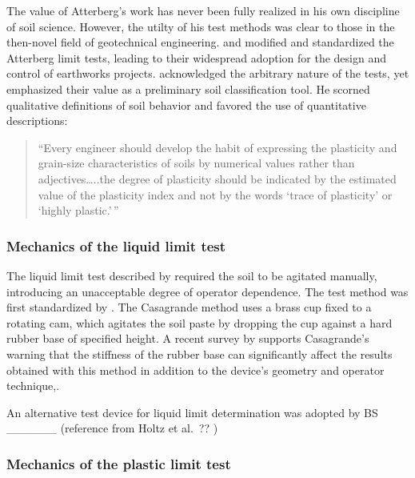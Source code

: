 \documentclass[
]{book}
\begin{document}
The value of Atterberg's work has never been fully realized in his own discipline of soil science. However, the utilty of his test methods was clear to those in the then-novel field of geotechnical engineering. \citet{Terzaghi1926} and \citet{Casagrande1932} modified and standardized the Atterberg limit tests, leading to their widespread adoption for the design and control of earthworks projects. \citet{Terzaghi1926} acknowledged the arbitrary nature of the tests, yet emphasized their value as a preliminary soil classification tool. He scorned qualitative definitions of soil behavior and favored the use of quantitative descriptions:

\begin{quote}
``Every engineer should develop the habit of expressing the plasticity and grain-size characteristics of soils by numerical values rather than adjectives\ldots..the degree of plasticity should be indicated by the estimated value of the plasticity index and not by the words `trace of plasticity' or `highly plastic.'\,''
\end{quote}

\citet{Terzaghi1996}

\hypertarget{mechanics-of-the-liquid-limit-test}{%
\subsubsection{Mechanics of the liquid limit test}\label{mechanics-of-the-liquid-limit-test}}

The liquid limit test described by \citet{Atterberg1911} required the soil to be agitated manually, introducing an unacceptable degree of operator dependence. The test method was first standardized by \citet{Casagrande1932}. The Casagrande method uses a brass cup fixed to a rotating cam, which agitates the soil paste by dropping the cup against a hard rubber base of specified height. A recent survey by \citet{Haigh2016} supports Casagrande's warning that the stiffness of the rubber base can significantly affect the results obtained with this method in addition to the device's geometry and operator technique,.

An alternative test device for liquid limit determination was adopted by BS \_\_\_\_\_\_ (reference from Holtz et al.~?? )

\hypertarget{mechanics-of-the-plastic-limit-test}{%
\subsubsection{Mechanics of the plastic limit test}\label{mechanics-of-the-plastic-limit-test}}
\end{document}
